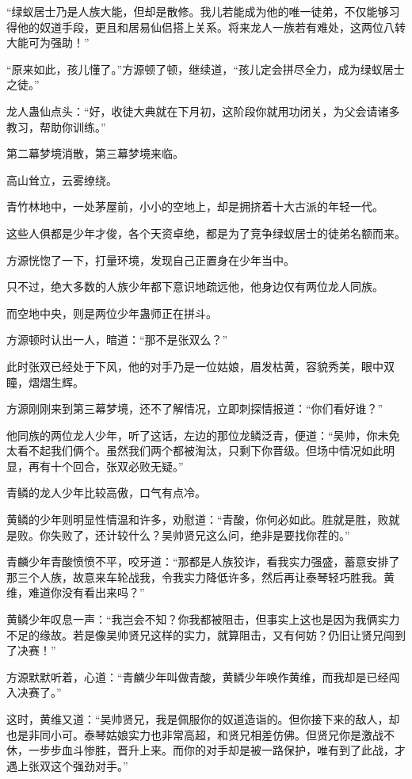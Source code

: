 \begin{this_body}
“绿蚁居士乃是人族大能，但却是散修。我儿若能成为他的唯一徒弟，不仅能够习得他的奴道手段，更且和居易仙侣搭上关系。将来龙人一族若有难处，这两位八转大能可为强助！”

“原来如此，孩儿懂了。”方源顿了顿，继续道，“孩儿定会拼尽全力，成为绿蚁居士之徒。”

龙人蛊仙点头：“好，收徒大典就在下月初，这阶段你就用功闭关，为父会请诸多教习，帮助你训练。”

第二幕梦境消散，第三幕梦境来临。

高山耸立，云雾缭绕。

青竹林地中，一处茅屋前，小小的空地上，却是拥挤着十大古派的年轻一代。

这些人俱都是少年才俊，各个天资卓绝，都是为了竞争绿蚁居士的徒弟名额而来。

方源恍惚了一下，打量环境，发现自己正置身在少年当中。

只不过，绝大多数的人族少年都下意识地疏远他，他身边仅有两位龙人同族。

而空地中央，则是两位少年蛊师正在拼斗。

方源顿时认出一人，暗道：“那不是张双么？”

此时张双已经处于下风，他的对手乃是一位姑娘，眉发枯黄，容貌秀美，眼中双瞳，熠熠生辉。

方源刚刚来到第三幕梦境，还不了解情况，立即刺探情报道：“你们看好谁？”

他同族的两位龙人少年，听了这话，左边的那位龙鳞泛青，便道：“吴帅，你未免太看不起我们俩个。虽然我们两个都被淘汰，只剩下你晋级。但场中情况如此明显，再有十个回合，张双必败无疑。”

青鳞的龙人少年比较高傲，口气有点冷。

黄鳞的少年则明显性情温和许多，劝慰道：“青酸，你何必如此。胜就是胜，败就是败。你失败了，还计较什么？吴帅贤兄这么问，绝非是要找你茬的。”

青麟少年青酸愤愤不平，咬牙道：“那都是人族狡诈，看我实力强盛，蓄意安排了那三个人族，故意来车轮战我，令我实力降低许多，然后再让泰琴轻巧胜我。黄维，难道你没有看出来吗？”

黄鳞少年叹息一声：“我岂会不知？你我都被阻击，但事实上这也是因为我俩实力不足的缘故。若是像吴帅贤兄这样的实力，就算阻击，又有何妨？仍旧让贤兄闯到了决赛！”

方源默默听着，心道：“青麟少年叫做青酸，黄鳞少年唤作黄维，而我却是已经闯入决赛了。”

这时，黄维又道：“吴帅贤兄，我是佩服你的奴道造诣的。但你接下来的敌人，却也是非同小可。泰琴姑娘实力也非常高超，和贤兄相差仿佛。但贤兄你是激战不休，一步步血斗惨胜，晋升上来。而你的对手却是被一路保护，唯有到了此战，才遇上张双这个强劲对手。”


\end{this_body}
